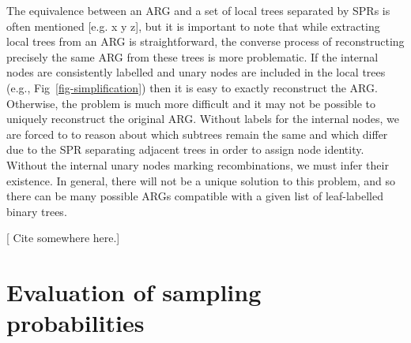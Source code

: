 \documentclass{article}
\begin{document}
The equivalence between an ARG and a set of local trees
separated by SPRs is often mentioned [e.g. x y z], but
it is important to note that while extracting local
trees from an ARG is straightforward, the converse
process of reconstructing precisely the same ARG from
these trees is more problematic. If the internal
nodes are consistently labelled and unary nodes are
included in the local trees (e.g., Fig~\ref{fig-simplification})
then it is easy to exactly reconstruct the ARG.
Otherwise, the problem is much more difficult and it
may not be possible to uniquely reconstruct the original ARG.
Without labels for the internal nodes, we are forced to
to reason about which subtrees remain the same and which
differ due to the SPR separating adjacent trees in order to
assign node identity. Without the internal unary nodes marking
recombinations, we must infer their existence. In
general, there will not be a unique solution to this problem,
and so there can be many possible ARGs compatible with
a given list of
leaf-labelled binary trees.

[ Cite \citep{deng2021distribution} somewhere here.]


\section*{Evaluation of sampling probabilities}\label{probabilities}
\end{document}
